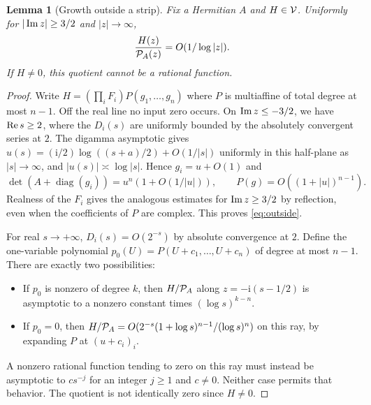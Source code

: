 \documentclass[11pt]{article}
\newtheorem{lemma}[theorem]{Lemma}
\theoremstyle{definition}\newtheorem{definition}[theorem]{Definition}
\newcommand{\ii}{\mathrm i}\newcommand{\diag}{\operatorname{diag}}
\begin{document}
\begin{lemma}[Growth outside a strip]\label{lem:outside}
Fix a Hermitian $A$ and $H\in\mathcal V$. Uniformly for $|\operatorname{Im} z|\ge3/2$ and $|z|\to\infty$,
\begin{equation}\label{eq:outside}
              \frac{H(z)}{\mathcal P_A(z)}=O(1/\log |z|).
\end{equation}
If $H\ne0$, this quotient cannot be a rational function.
\end{lemma}
\begin{proof}
Write $H=(\prod_i F_i)P(g_1,\ldots,g_n)$ where $P$ is multiaffine of total degree at most $n-1$. Off the real line no input zero occurs. On $\operatorname{Im} z\le-3/2$, we have $\operatorname{Re} s\ge2$, where the $D_i(s)$ are uniformly bounded by the absolutely convergent series at $2$. The digamma asymptotic gives $u(s)=(\ii/2)\log((s+a)/2)+O(1/|s|)$ uniformly in this half-plane as $|s|\to\infty$, and $|u(s)|\asymp\log |s|$. Hence $g_i=u+O(1)$ and
\[
 \det(A+\diag(g_i))=u^n(1+O(1/|u|)),\qquad P(g)=O((1+|u|)^{n-1}).
\]
Realness of the $F_i$ gives the analogous estimates for $\operatorname{Im} z\ge3/2$ by reflection, even when the coefficients of $P$ are complex. This proves \eqref{eq:outside}.

For real $s\to+\infty$, $D_i(s)=O(2^{-s})$ by absolute convergence at $2$. Define the one-variable polynomial $p_0(U)=P(U+c_1,\ldots,U+c_n)$ of degree at most $n-1$. There are exactly two possibilities:
\begin{itemize}
 \item If $p_0$ is nonzero of degree $k$, then $H/\mathcal P_A$ along $z=-\ii(s-1/2)$ is asymptotic to a nonzero constant times $(\log s)^{k-n}$.
 \item If $p_0=0$, then $H/\mathcal P_A=O(2^{-s}(1+\log s)^{n-1}/(\log s)^n)$ on this ray, by expanding $P$ at $(u+c_i)_i$.
\end{itemize}
A nonzero rational function tending to zero on this ray must instead be asymptotic to $c s^{-j}$ for an integer $j\ge1$ and $c\ne0$. Neither case permits that behavior. The quotient is not identically zero since $H\ne0$.
\end{proof}
\end{document}
